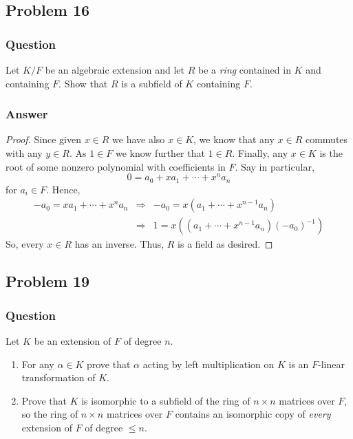 \documentclass[10pt]{article}
\begin{document}
\subsection{Problem 16}
\subsubsection{Question}
Let $K/F$ be an algebraic extension and let $R$ be a \emph{ring} contained in $K$ and containing $F$. Show that $R$ is a subfield of $K$ containing $F$.
\subsubsection{Answer}
\begin{proof}
Since given $x \in R$ we have also $x \in K$, we know that any $x \in R$ commutes with any $y \in R$. As $1 \in F$ we know further that $1 \in R$. Finally, any $x \in K $ is the root of some nonzero polynomial with coefficients in $F$. Say in particular,
\[0 = a_0 +x a_1 + \cdots + x^n a_n\] 
for $a_i \in F$. Hence,
\begin{eqnarray*}-a_0 = x a_1 + \cdots + x^n a_n  &\Rightarrow& -a_0 = x(  a_1 + \cdots + x^{n-1} a_n) \\ &\Rightarrow& 1 =  x \left( ( a_1 + \cdots + x^{n-1} a_n) ( -a_0)^{-1}\right) \end{eqnarray*}
So, every $x \in R$ has an inverse. Thus, $R$ is a field as desired.
\end{proof}

\subsection{Problem 19}
\subsubsection{Question}
Let $K$ be an extension of $F$ of degree $n$. 
\begin{enumerate}
\item For any $\alpha \in K$ prove that $\alpha$ acting by left multiplication on $K$ is an $F$-linear transformation of $K$.
\item Prove that $K$ is isomorphic to a subfield of the ring of $n \times n$ matrices over $F$, so the ring of $n \times n$ matrices over $F$ contains an isomorphic copy of \emph{every} extension of $F$ of degree $\leq n$.
\end{enumerate}
\end{document}
